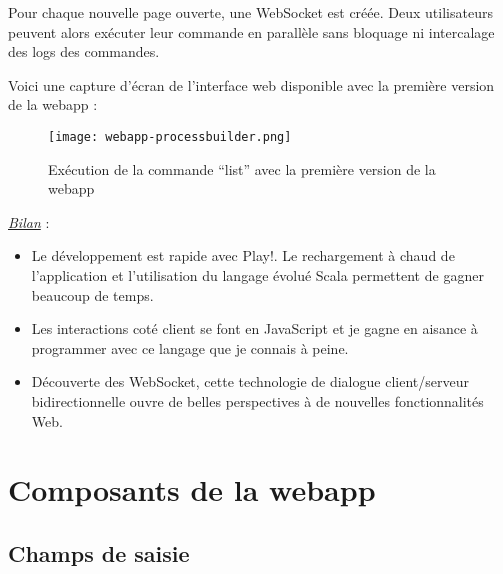 Pour chaque nouvelle page ouverte, une WebSocket est créée.
Deux utilisateurs peuvent alors exécuter leur commande en parallèle sans
bloquage ni intercalage des logs des commandes.

Voici une capture d'écran de l'interface web disponible avec la première version
de la webapp :
\begin{figure}[H]
  \texttt{[image: webapp-processbuilder.png]}
  \caption{Exécution de la commande ``list'' avec la première version de la webapp}
\end{figure}

\underline{\textit{Bilan}} :
\begin{itemize}
\item Le développement est rapide avec Play!. Le rechargement à
chaud de l'application et l'utilisation du langage évolué Scala permettent de
gagner beaucoup de temps.  
\item Les interactions coté client se font en JavaScript et
je gagne en aisance à programmer avec ce langage que je connais à peine.
\item  Découverte des WebSocket, cette technologie de dialogue client/serveur
  bidirectionnelle ouvre de belles perspectives à de nouvelles fonctionnalités
  Web.
\end{itemize}

\section{Composants de la webapp}

\subsection{Champs de saisie}

